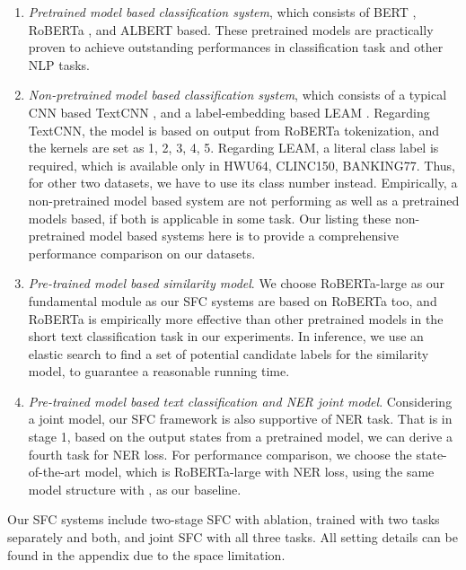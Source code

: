 \begin{enumerate}
  \item \emph{Pretrained model based classification system}, which consists of
  BERT \cite{devlin2018bert},  RoBERTa \cite{liu2019roberta},  and  ALBERT  \cite{lan2019albert}  based.  These pretrained
  models  are  practically  proven  to  achieve  outstanding  performances  in
  classification task and other NLP tasks.

  \item   \emph{Non-pretrained   model  based  classification  system},  which
  consists  of  a typical CNN based TextCNN \cite{kim2014convolutional}, and a
  label-embedding based LEAM \cite{wang2018joint}. Regarding TextCNN, the
  model is based on output from RoBERTa tokenization, and the kernels are set
  as 1, 2, 3, 4, 5. Regarding LEAM, a literal class label is required, which
  is available only in HWU64, CLINC150, BANKING77. Thus, for other two
  datasets, we have to use its class number instead.  Empirically,
  a  non-pretrained  model  based  system  are  not  performing  as  well as a
  pretrained  models  based,  if  both is applicable in some task. Our listing
  these  non-pretrained model based systems here is to provide a comprehensive
  performance comparison on our datasets.

  \item   \emph{Pre-trained   model   based   similarity   model}.  We  choose
  RoBERTa-large  as  our  fundamental  module as our SFC systems are based on
  RoBERTa  too, and RoBERTa is empirically more effective than other pretrained
  models  in  the  short  text  classification  task  in  our  experiments. In
  inference,  we  use  an  elastic search to find a set of potential candidate
  labels for the similarity model, to guarantee a reasonable running time.
  
  \item \emph{Pre-trained model based text classification and NER joint model}. Considering  a  joint  model,  our  SFC framework  is also supportive of NER task. That  is  in  stage  1,  based on the  output  states from a
pretrained model, we can derive a fourth task for NER loss. For performance comparison, we choose the state-of-the-art model, which is RoBERTa-large with NER loss, using the same model structure with \cite{chen2019bert}, as our baseline.
\end{enumerate}

Our SFC systems include two-stage SFC with ablation, trained with two tasks
separately and both, and joint SFC with all three tasks. All setting details can
be found in the appendix due to the space limitation.

